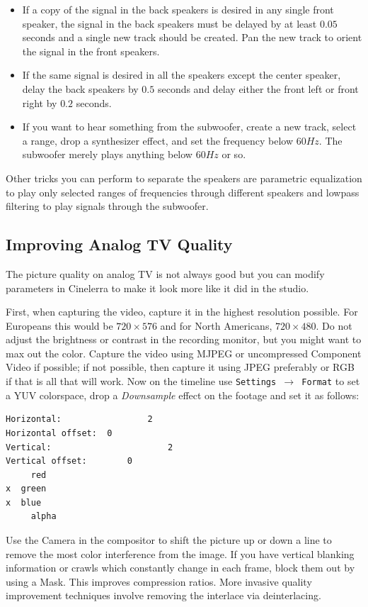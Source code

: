 \begin{itemize}
	\item If a copy of the signal in the back speakers is desired in any single front speaker, the signal in the back
	speakers must be delayed by at least $0.05$ seconds and a single new track should be created. Pan the
	new track to orient the signal in the front speakers.
	\item If the same signal is desired in all the speakers except the center speaker, delay the back speakers by
	$0.5$ seconds and delay either the front left or front right by $0.2$ seconds.
	\item If you want to hear something from the subwoofer, create a new track, select a range, drop a
	synthesizer effect, and set the frequency below $60 Hz$. The subwoofer merely plays anything below
	$60Hz$ or so.
\end{itemize}

Other tricks you can perform to separate the speakers are parametric equalization to play only selected ranges of frequencies through different speakers and lowpass filtering to play signals through the subwoofer.

\subsection{Improving Analog TV Quality}%
\label{sub:improving_tv_quality}

The picture quality on analog TV is not always good but you can modify parameters in Cinelerra to make it look more like it did in the studio.

First, when capturing the video, capture it in the highest resolution possible. For Europeans this would be $720\times576$ and for North Americans, $720\times480$. Do not adjust the brightness or contrast in the recording monitor, but you might want to max out the color. Capture the video using MJPEG or uncompressed Component Video if possible; if not possible, then capture it using JPEG preferably or RGB if that is all that will work.  Now on the timeline use \texttt{Settings $\rightarrow$ Format} to set a YUV colorspace, drop a \textit{Downsample} effect on the footage and set it as follows:

\begin{lstlisting}[numbers=none]
Horizontal:					2
Horizontal offset: 	0
Vertical:						2
Vertical offset: 		0
	 red
x  green
x  blue
	 alpha
\end{lstlisting}

Use the Camera in the compositor to shift the picture up or down a line to remove the most color interference from the image. If you have vertical blanking information or crawls which constantly change in each frame, block them out by using a Mask. This improves compression ratios.   More invasive quality improvement techniques involve removing the interlace via deinterlacing.

